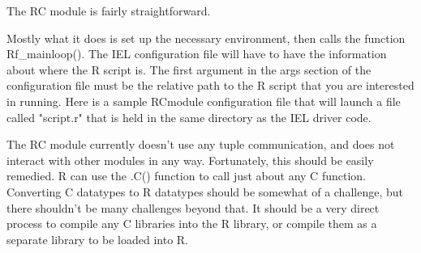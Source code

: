 The RC module is fairly straightforward.



Mostly what it does is set up the necessary environment, then calls the function Rf\_mainloop(). The IEL configuration file will have to have the information about where the R script is. The first argument in the args section of the configuration file must be the relative path to the R script that you are interested in running. Here is a sample RCmodule configuration file that will launch a file called "script.r" that is held in the same directory as the IEL driver code.



The RC module currently doesn't use any tuple communication, and does not interact with other modules in any way. Fortunately, this should be easily remedied. R can use the .C() function to call just about any C function. Converting C datatypes to R datatypes should be somewhat of a challenge, but there shouldn't be many challenges beyond that. It should be a very direct process to compile any C libraries into the R library, or compile them as a separate library to be loaded into R.
